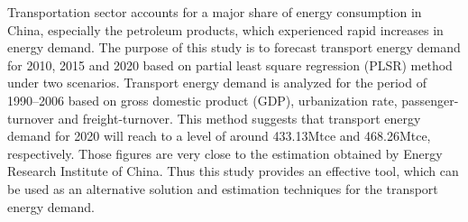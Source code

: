 Transportation sector accounts for a major share of energy consumption in China, especially the petroleum products, which experienced rapid increases in energy demand. The purpose of this study is to forecast transport energy demand for 2010, 2015 and 2020 based on partial least square regression (PLSR) method under two scenarios. Transport energy demand is analyzed for the period of 1990–2006 based on gross domestic product (GDP), urbanization rate, passenger-turnover and freight-turnover. This method suggests that transport energy demand for 2020 will reach to a level of around 433.13Mtce and 468.26Mtce, respectively. Those figures are very close to the estimation obtained by Energy Research Institute of China. Thus this study provides an effective tool, which can be used as an alternative solution and estimation techniques for the transport energy demand.